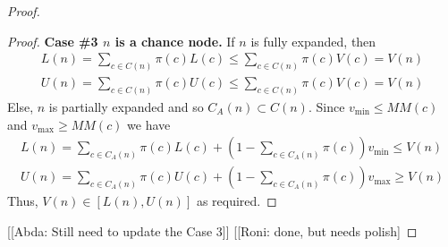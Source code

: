 \documentclass[letterpaper]{article} %
\newcommand{\MM}{\mathit{V}}
\newcommand{\pess}{\mathit{L}}
\newcommand{\opti}{\mathit{U}}
\newcommand{\vmax}{v_{\text{max}}}
\newcommand{\vmin}{v_{\text{min}}}
\begin{document}
\begin{proof}
\begin{proof}
\noindent \textbf{Case \#3 $n$ is a chance node.} If $n$ is fully expanded, then 
\begin{align}
 \!\!\!\!\pess(n) \!\! = \!\!\!\!\sum_{c\in C(n)} \pi(c) \pess(c) \leq \!\!\!\! \sum_{c\in C(n)} \pi(c) \MM(c) = \MM(n) \\
  \!\!\opti(n) \!\! = \!\!\!\!\sum_{c\in C(n)} \pi(c) \opti(c) \leq \!\!\!\! \sum_{c\in C(n)} \pi(c) \MM(c) = \MM(n)  
\end{align}
Else, $n$ is partially expanded and so $C_A(n) \subset C(n)$. Since $\vmin\leq MM(c)$ and $\vmax\geq MM(c)$ we have
\begin{align}
 \!\!\!\!\pess(n) \!\! = \!\!\!\!\!\!\sum_{c\in C_A(n)} \pi(c) \pess(c)+ 
 (1-\!\!\!\!\sum_{c\in C_A(n)}\!\!\!\! \pi(c)) \vmin \leq \MM(n)\\
 \!\!\opti(n) \!\! = \!\!\!\!\!\!\sum_{c\in C_A(n)} \pi(c) \opti(c)+ 
 (1-\!\!\!\!\sum_{c\in C_A(n)}\!\!\!\! \pi(c)) \vmax \geq \MM(n) 
\end{align}
Thus, $\MM(n)\in [\pess(n), \opti(n)]$ as required. 

\end{proof}
[[Abda: Still need to update the Case 3]]
[[Roni: done, but needs polish]



\end{proof}
\end{document}
